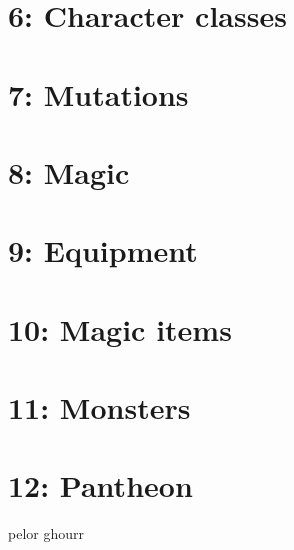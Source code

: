 \documentclass[a4paper]{article}
\begin{document}
\section{6: Character classes}

\section{7: Mutations}

\section{8: Magic}

\section{9: Equipment}

\section{10: Magic items}

\section{11: Monsters}

\section{12: Pantheon}


pelor ghourr
\end{document}
